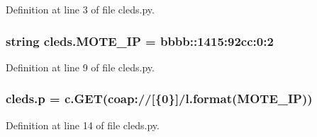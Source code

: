 Definition at line 3 of file cleds.\+py.

\subsubsection[{\texorpdfstring{M\+O\+T\+E\+\_\+\+IP}{MOTE_IP}}]{\setlength{\rightskip}{0pt plus 5cm}string cleds.\+M\+O\+T\+E\+\_\+\+IP = \textquotesingle{}bbbb\+::1415\+:92cc\+:0\+:2\textquotesingle{}}\hypertarget{namespacecleds_a9a2c12b44feb059b23acbdfa6c7faaf7}{}\label{namespacecleds_a9a2c12b44feb059b23acbdfa6c7faaf7}


Definition at line 9 of file cleds.\+py.

\subsubsection[{\texorpdfstring{p}{p}}]{\setlength{\rightskip}{0pt plus 5cm}cleds.\+p = c.\+G\+ET(\textquotesingle{}coap\+://\mbox{[}\{0\}\mbox{]}/l\textquotesingle{}.format({\bf M\+O\+T\+E\+\_\+\+IP}))}\hypertarget{namespacecleds_a13c2b6ecb2e12045fd9a9df703991cfe}{}\label{namespacecleds_a13c2b6ecb2e12045fd9a9df703991cfe}


Definition at line 14 of file cleds.\+py.

